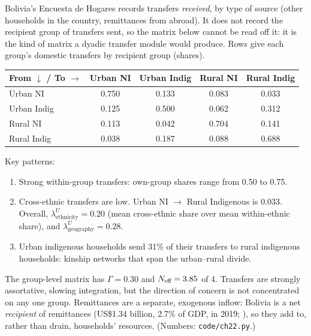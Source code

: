 \documentclass[../structural_economics_book.tex]{subfiles}
\begin{document}
\begin{example}\label{ch22:ex:transfers}
Bolivia's Encuesta de Hogares records transfers \emph{received}, by type of source (other households in the country, remittances from abroad). It does not record the recipient group of transfers sent, so the matrix below cannot be read off it: it is the kind of matrix a dyadic transfer module would produce. Rows give each group's domestic transfers by recipient group (shares).

\begin{center}
\small
\begin{tabular}{l|cccc}
\toprule
From $\downarrow$ / To $\to$ & Urban NI & Urban Indig & Rural NI & Rural Indig \\
\midrule
Urban NI & 0.750 & 0.133 & 0.083 & 0.033 \\
Urban Indig & 0.125 & 0.500 & 0.062 & 0.312 \\
Rural NI & 0.113 & 0.042 & 0.704 & 0.141 \\
Rural Indig & 0.038 & 0.187 & 0.088 & 0.688 \\
\bottomrule
\end{tabular}
\end{center}

Key patterns:
\begin{enumerate}
\item Strong within-group transfers: own-group shares range from 0.50 to 0.75.
\item Cross-ethnic transfers are low. Urban NI $\to$ Rural Indigenous is 0.033. Overall, $\lambda^U_{\text{ethnicity}} = 0.20$ (mean cross-ethnic share over mean within-ethnic share), and $\lambda^U_{\text{geography}} = 0.28$.
\item Urban indigenous households send 31\% of their transfers to rural indigenous households: kinship networks that span the urban--rural divide.
\end{enumerate}
The group-level matrix has $\Gamma = 0.30$ and $N_{\text{eff}} = 3.85$ of 4. Transfers are strongly assortative, slowing integration, but the direction of concern is not concentrated on any one group. Remittances are a separate, exogenous inflow: Bolivia is a net \emph{recipient} of remittances (US\$1.34 billion, 2.7\% of GDP, in 2019; \citealp{worldbank2026wdi}), so they add to, rather than drain, households' resources. (Numbers: \texttt{code/ch22.py}.)
\end{example}
\end{document}
